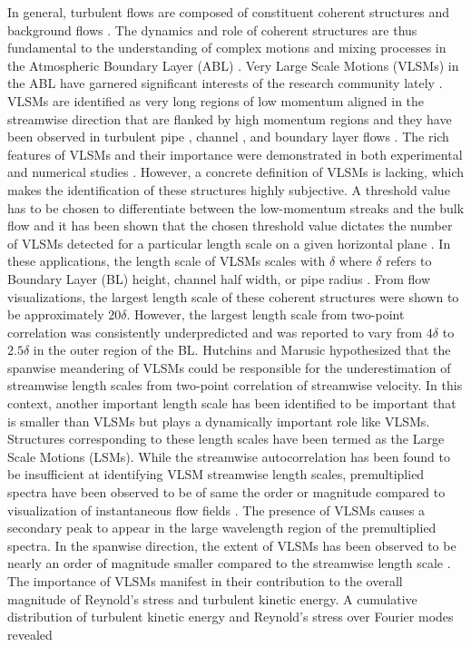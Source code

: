 In general, turbulent flows  are composed of constituent coherent structures and background flows \cite{hussain_1986_jfm}. The dynamics and role of coherent structures are thus fundamental to the understanding of complex motions and mixing processes in the Atmospheric Boundary Layer (ABL) \cite{lewalle_flowTurbCom_00,Fiedler_PAeroSci_1988}. Very Large Scale Motions (VLSMs) in the ABL have garnered significant interests of the research community lately \cite{Chinthaka_blm_2017,kerherv_roux_etfs_2017}. VLSMs  are identified as  very long regions of low momentum  aligned in the streamwise direction that are flanked by high momentum regions and they have been observed in turbulent pipe \cite{guala_adrian_jfm2006, kim_adrian_pof99, monty_jfm_07}, channel \cite{guala_adrian_jfm2006, monty_jfm_07, lee_sung_jfm_14}, and boundary layer flows \cite{fang2015blm,hutchins_marusic_jfm2007}. The rich features of VLSMs and their importance were demonstrated in both experimental \cite{kim_adrian_pof99,guala_adrian_jfm2006,hutchins_marusic_jfm2007,monty_jfm_07} and numerical studies \cite{fang2015blm,lee_sung_jfm_14,Lee_sung_jfm11}. However, a concrete definition of VLSMs is lacking, which makes the identification of these structures highly subjective. A threshold value has to be chosen to differentiate between the low-momentum streaks and the bulk flow and it has been shown that the chosen threshold value dictates the number of VLSMs detected for a particular length scale on a given horizontal plane \cite{baltzer_jfm_13}. In these applications, the length scale of VLSMs scales with $\delta$ where $\delta$ refers to Boundary Layer (BL)  height, channel half width, or pipe radius \cite{chung_jfm_10_large,monty_jfm_07}. From flow visualizations, the largest length scale of these coherent structures  were shown to be approximately $20\delta$. However,  the largest length scale from two-point correlation was consistently underpredicted and was reported to vary from $4\delta$ to $2.5\delta$ in the outer region of the BL. Hutchins and Marusic  \cite{hutchins_marusic_jfm2007} hypothesized that the spanwise meandering of VLSMs could be responsible for the underestimation of streamwise length scales from two-point correlation of streamwise velocity. In this context, another important length scale has been identified to be important that is smaller than VLSMs but plays a dynamically important role like VLSMs. Structures corresponding to these length scales have been termed as the Large Scale Motions (LSMs). While the streamwise autocorrelation has been found to be insufficient at identifying VLSM streamwise length scales, premultiplied spectra have been observed to be of  same the order or magnitude compared to  visualization of instantaneous flow fields \cite{guala_adrian_jfm2006}.  The presence of VLSMs causes a secondary peak to appear in the large wavelength region of the premultiplied spectra. In the spanwise direction, the extent of VLSMs has been observed to be nearly an order of magnitude  smaller compared to the  streamwise length scale \cite{monty_jfm_07}.  The importance of VLSMs manifest in their  contribution to the overall magnitude of Reynold's stress and turbulent kinetic  energy.  A cumulative  distribution  of turbulent kinetic energy  and Reynold's stress  over Fourier modes revealed 